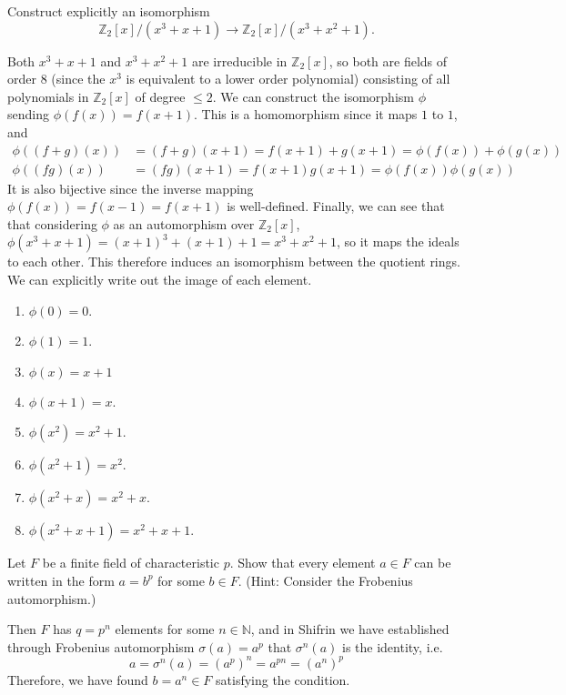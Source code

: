   \begin{exercise}[Shifrin 5.3.4]
    Construct explicitly an isomorphism
    \[
      \mathbb{Z}_2[x]/(x^3 + x + 1) \to \mathbb{Z}_2[x]/(x^3 + x^2 + 1).
    \]
  \end{exercise}
  \begin{solution}
    Both $x^3 + x + 1$ and $x^3 + x^2 + 1$ are irreducible in $\mathbb{Z}_2 [x]$, so both are fields of order $8$ (since the $x^3$ is equivalent to a lower order polynomial) consisting of all polynomials in $\mathbb{Z}_2 [x]$ of degree $\leq 2$. We can construct the isomorphism $\phi$ sending $\phi(f(x)) = f(x+1)$. This is a homomorphism since it maps $1$ to $1$, and 
    \begin{align}
      \phi((f + g)(x)) & = (f + g)(x + 1) = f(x+1) + g(x+1) = \phi(f(x)) + \phi(g(x)) \\
      \phi((fg)(x)) & = (fg)(x + 1) = f(x + 1) g(x + 1) = \phi(f(x)) \phi(g(x))
    \end{align}
    It is also bijective since the inverse mapping $\phi(f(x)) = f(x - 1) = f(x + 1)$ is well-defined. Finally, we can see that that considering $\phi$ as an automorphism over $\mathbb{Z}_2[x]$, $\phi(x^3 + x + 1) = (x + 1)^3 + (x + 1) + 1 = x^3 + x^2 + 1$, so it maps the ideals to each other. This therefore induces an isomorphism between the quotient rings. We can explicitly write out the image of each element. 
    \begin{enumerate}
      \item $\phi(0) = 0$. 
      \item $\phi(1) = 1$. 
      \item $\phi(x) = x + 1$ 
      \item $\phi(x + 1) = x$. 
      \item $\phi(x^2) = x^2 + 1$. 
      \item $\phi(x^2 + 1) = x^2$. 
      \item $\phi(x^2 + x) = x^2 + x$. 
      \item $\phi(x^2 + x + 1) = x^2 + x + 1$. 
    \end{enumerate}
  \end{solution}

  \begin{exercise}[Shifrin 5.3.5]
    Let $F$ be a finite field of characteristic $p$. Show that every element $a \in F$ can be written in the form $a = b^p$ for some $b \in F$. (Hint: Consider the Frobenius automorphism.)
  \end{exercise}
  \begin{solution}
    Then $F$ has $q = p^n$ elements for some $n \in \mathbb{N}$, and in Shifrin we have established through Frobenius automorphism $\sigma(a) = a^p$ that $\sigma^n (a)$ is the identity, i.e. 
    \begin{equation}
      a = \sigma^n (a) = (a^p)^n = a^{pn} = (a^n)^p
    \end{equation}
    Therefore, we have found $b = a^n \in F$ satisfying the condition. 
  \end{solution}

